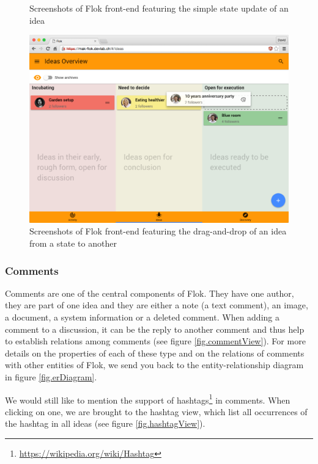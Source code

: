 \documentclass[a4paper,12pt,twoside]{article}
\begin{document}
\begin{figure}[!htb]
\begin{subfigure}{.48\textwidth}
    \end{subfigure}
    \caption{Screenshots of Flok front-end featuring the simple state update of an idea}
    \label{fig.stateSelect}
\end{figure}

\begin{figure}[!htb]
    \centering
    \includegraphics[width=\textwidth]{images/stateDragAndDrop.png}
    \caption{Screenshots of Flok front-end featuring the drag-and-drop of an idea from a state to another}
    \label{fig.stateDragAndDrop}
\end{figure}

\FloatBarrier
\subsubsection{Comments}
\label{sec.comments}
Comments are one of the central components of Flok.
They have one author, they are part of one idea and they are either a note (a text comment), an image, a document, a system information or a deleted comment.
When adding a comment to a discussion, it can be the reply to another comment and thus help to establish relations among comments (see figure \ref{fig.commentView}).
For more details on the properties of each of these type and on the relations of comments with other entities of Flok, we send you back to the entity-relationship diagram in figure \ref{fig.erDiagram}.

We would still like to mention the support of hashtags\footnote{\url{https://wikipedia.org/wiki/Hashtag}} in comments.
When clicking on one, we are brought to the hashtag view, which list all occurrences of the hashtag in all ideas (see figure \ref{fig.hashtagView}).
\end{document}
